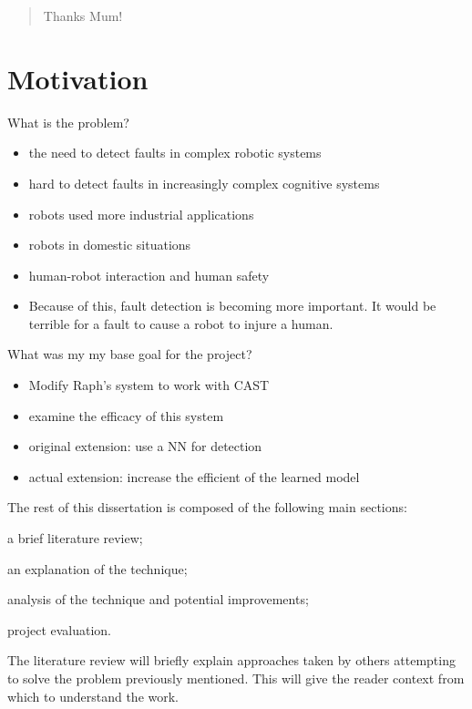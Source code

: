 \documentclass[11pt, a4paper]{report}
\begin{document}
\renewcommand{\abstractname}{Acknowledgments}
\begin{abstract}
  Thanks Mum!
\end{abstract}

\chapter{Motivation}
\label{cha:motivation}


What is the problem?
\begin{itemize}
\item the need to detect faults in complex robotic systems
\item hard to detect faults in increasingly complex cognitive systems
\item robots used more industrial applications
\item robots in domestic situations
\item human-robot interaction and human safety
\item Because of this, fault detection is becoming more important. It
  would be terrible for a fault to cause a robot to injure a human.
\end{itemize}

\noindent What was my my base goal for the project?
\begin{itemize}
\item Modify Raph's system to work with CAST
\item examine the efficacy of this system
\item original extension: use a NN for detection
\item actual extension: increase the efficient of the learned model
\end{itemize}

The rest of this dissertation is composed of the following main
sections:
\begin{inparaenum}
\item a brief literature review;
\item an explanation of the technique;
\item analysis of the technique and potential improvements;
\item project evaluation.
\end{inparaenum} The literature review will briefly explain approaches
taken by others attempting to solve the problem previously mentioned.
This will give the reader context from which to understand the work.
\end{document}
